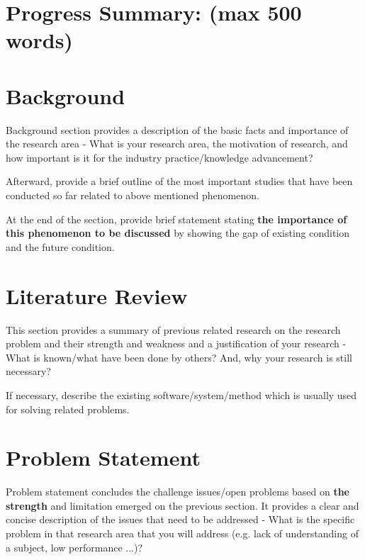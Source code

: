 \documentclass{ittelkom}
\begin{document}

\newpage
\normalsize
\tableofcontents

\newpage
\section*{Progress Summary: (max 500 words)}
 \label{summary}


\section{Background} \label{background}
Background section provides a description of the basic facts and importance of the research area - What is your research area, the motivation of research, and how important is it for the industry practice/knowledge advancement?



Afterward, provide a brief outline of the most important studies that have been conducted so far related to above mentioned phenomenon.

At the end of the section, provide brief statement stating {\bf the importance of this phenomenon to be discussed} by showing the gap of existing condition and the future condition.

\section{Literature Review}
This section provides a summary of previous related research on the research problem and their strength and weakness and a justification of your research - What is known/what have been done by others? And, why your research is still necessary?

If necessary, describe the existing software/system/method which is usually used for solving related problems.

\section{Problem Statement}
Problem statement concludes the challenge issues/open problems based on {\bf the strength} and limitation emerged on the previous section. It provides a clear and concise description of the issues that need to be addressed - What is the specific problem in that research area that you will address (e.g. lack of understanding of a subject, low performance ...)?
\end{document}
